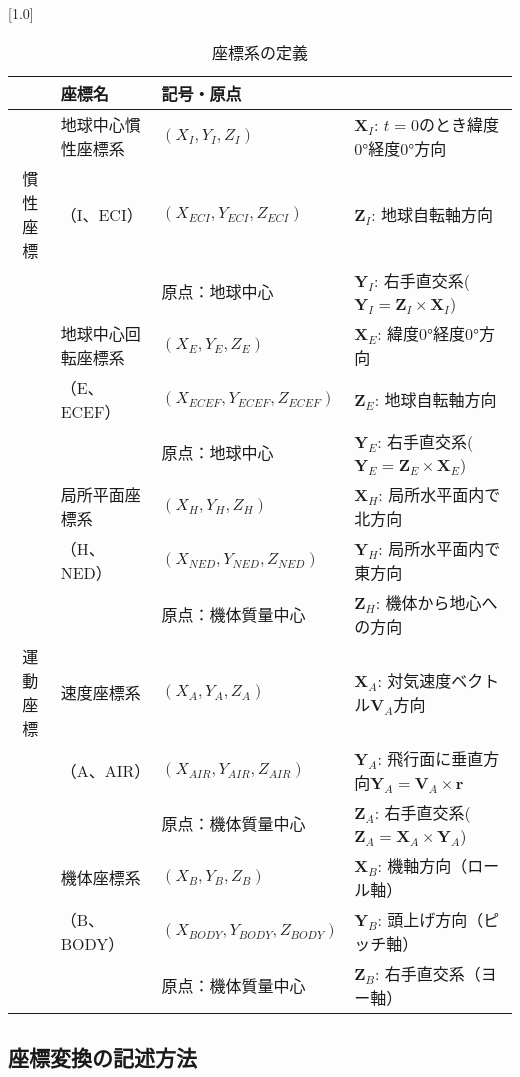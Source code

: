 \documentclass[12pt]{jsarticle}
\begin{document}
\begin{table}[htb]
  \caption{座標系の定義}
  \label{座標系}
  \scalebox{0.9}[1.0]{
  \begin{tabular}{|c|l|l|l|} \hline
     & 座標名 & 記号・原点 & \\ \hline \hline
     & {\footnotesize 地球中心慣性座標系} & $(X_I, Y_I, Z_I)$ & $\bm{X}_I$: $t=0$のとき緯度0°経度0°方向 \\
    {\small 慣性座標} & （I、ECI）& {\footnotesize $(X_{ECI}, Y_{ECI}, Z_{ECI})$} & $\bm{Z}_I$: 地球自転軸方向 \\
     & & 原点：地球中心 & $\bm{Y}_I$: 右手直交系($\bm{Y}_I = \bm{Z}_I \times \bm{X}_I$) \\ \hline
     & {\footnotesize 地球中心回転座標系} & $(X_E, Y_E, Z_E)$ & $\bm{X}_E$: 緯度0°経度0°方向 \\
     & （E、ECEF）& {\footnotesize $(X_{ECEF}, Y_{ECEF}, Z_{ECEF})$} & $\bm{Z}_E$: 地球自転軸方向 \\
     & & 原点：地球中心 & $\bm{Y}_E$: 右手直交系($\bm{Y}_E = \bm{Z}_E \times \bm{X}_E$) \\ \cline{2-4}
     & 局所平面座標系 & $(X_H, Y_H, Z_H)$ &  $\bm{X}_H$: 局所水平面内で北方向 \\
     & （H、NED） & {\footnotesize $(X_{NED}, Y_{NED}, Z_{NED})$} & $\bm{Y}_H$: 局所水平面内で東方向\\
     & & 原点：機体質量中心 &  $\bm{Z}_H$: 機体から地心への方向 \\ \cline{2-4}
     {\small 運動座標} & 速度座標系 & $(X_A, Y_A, Z_A)$ & $\bm{X}_A$: 対気速度ベクトル$\bm{V}_A$方向 \\
     & （A、AIR） & {\footnotesize $(X_{AIR}, Y_{AIR}, Z_{AIR})$} & $\bm{Y}_A$: 飛行面に垂直方向$\bm{Y}_A = \bm{V}_A \times \bm{r}$ \\
     & & 原点：機体質量中心 & $\bm{Z}_A$: 右手直交系($\bm{Z}_A = \bm{X}_A \times \bm{Y}_A$) \\ \cline{2-4}
     & 機体座標系 & $(X_B, Y_B, Z_B)$ & $\bm{X}_B$: 機軸方向（ロール軸） \\
     & （B、BODY） & {\footnotesize $(X_{BODY}, Y_{BODY}, Z_{BODY})$} & $\bm{Y}_B$: 頭上げ方向（ピッチ軸）\\
     & & 原点：機体質量中心 & $\bm{Z}_B$: 右手直交系（ヨー軸）\\ \hline
  \end{tabular}
  }
\end{table}

\subsection{座標変換の記述方法}
\end{document}
